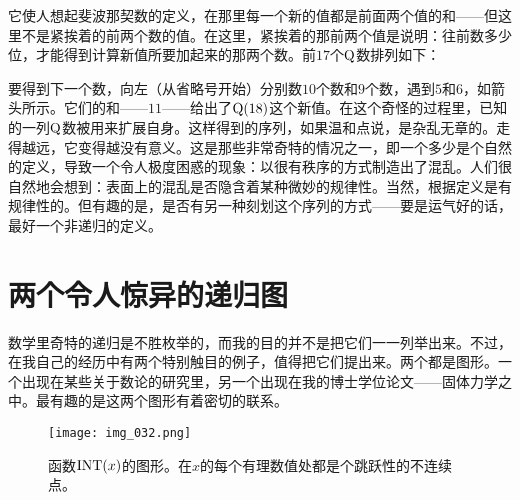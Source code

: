 它使人想起斐波那契数的定义，在那里每一个新的值都是前面两个值的和——但这里不是紧挨着的前两个数的值。在这里，紧挨着的那前两个值是说明：往前数多少位，才能得到计算新值所要加起来的那两个数。前$17$个$\operatorname{Q}$数排列如下：
\begin{figure}[H]
\end{figure}
要得到下一个数，向左（从省略号开始）分别数$10$个数和$9$个数，遇到$5$和$6$，如箭头所示。它们的和——$11$——给出了$\operatorname{Q}(18)$这个新值。在这个奇怪的过程里，已知的一列$\operatorname{Q}$数被用来扩展自身。这样得到的序列，如果温和点说，是杂乱无章的。走得越远，它变得越没有意义。这是那些非常奇特的情况之一，即一个多少是个自然的定义，导致一个令人极度困惑的现象：以很有秩序的方式制造出了混乱。人们很自然地会想到：表面上的混乱是否隐含着某种微妙的规律性。当然，根据定义是有规律性的。但有趣的是，是否有另一种刻划这个序列的方式——要是运气好的话，最好一个非递归的定义。

\section{两个令人惊异的递归图}

数学里奇特的递归是不胜枚举的，而我的目的并不是把它们一一列举出来。不过，在我自己的经历中有两个特别触目的例子，值得把它们提出来。两个都是图形。一个出现在某些关于数论的研究里，另一个出现在我的博士学位论文——固体力学之中。最有趣的是这两个图形有着密切的联系。

\begin{figure}
\texttt{[image: img\_032.png]}
\caption[函数$\INT(x)$的图形。]
  {函数$\INT(x)$的图形。在$x$的每个有理数值处都是个跳跃性的不连续点。}
\end{figure}

